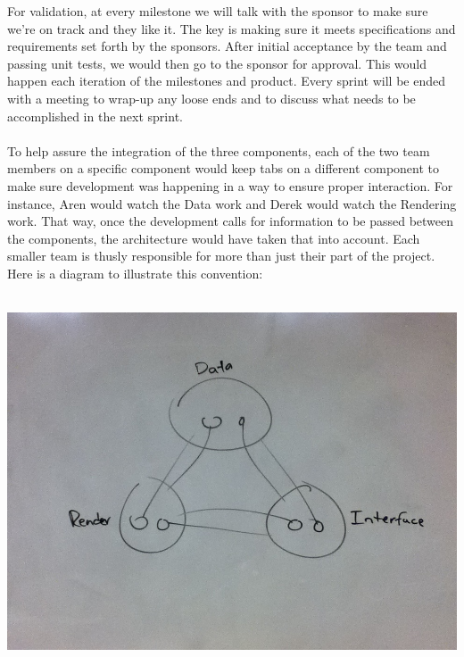 \documentclass[12pt, letterpaper]{article}
\begin{document}
	For validation, at every milestone we will talk with the sponsor to make
    sure we're on track and they like it. The key is making sure it meets
    specifications and requirements set forth by the sponsors. After initial
    acceptance by the team and passing unit tests, we would then go to the
    sponsor for approval. This would happen each iteration of the milestones and
    product. Every sprint will be ended with a meeting to wrap-up any loose ends
    and to discuss what needs to be accomplished in the next sprint.
	\\\\
	To help assure the integration of the three components, each of the two team
    members on a specific component would keep tabs on a different component to
    make sure development was happening in a way to ensure proper interaction.
    For instance, Aren would watch the Data work and Derek would watch the
    Rendering work. That way, once the development calls for information to be
    passed between the components, the architecture would have taken that into
    account. Each smaller team is thusly responsible for more than just their
    part of the project. Here is a diagram to illustrate this convention:\\\\

\begin{center}
	\includegraphics[width=1\textwidth]{./whiteboards/portion-checks}
\end{center}
\end{document}
